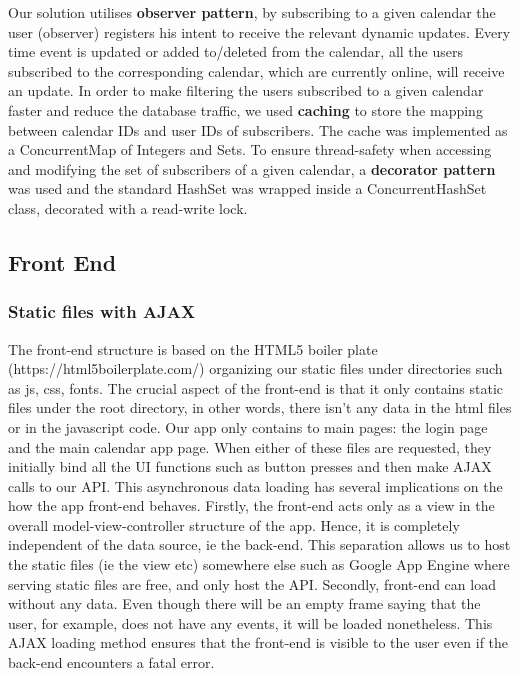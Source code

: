 \documentclass[10pt,a4paper]{article}
\begin{document}
Our solution utilises \textbf{observer pattern}, by subscribing to a given calendar the user (observer) registers his intent to receive the relevant dynamic updates. Every time event is updated 
or added to/deleted from the calendar, all the users subscribed to the corresponding calendar, which are currently online, will receive an update. In order to make filtering the users
subscribed to a given calendar faster and reduce the database traffic, we used \textbf{caching} to store the mapping between calendar IDs and user IDs of subscribers. The cache was implemented
as a ConcurrentMap of Integers and Sets. To ensure thread-safety when accessing and modifying the set of subscribers of a given calendar, a \textbf{decorator pattern} was used and the standard
HashSet was wrapped inside a ConcurrentHashSet class, decorated with a read-write lock.

\subsection{Front End}
\subsubsection{Static files with AJAX}
The front-end structure is based on the HTML5 boiler plate (https://html5boilerplate.com/) organizing our static files under directories such as js, css, fonts. The crucial aspect of the front-end is that it only contains static files under the root directory, in other words, there isn't any data in the html files or in the javascript code. Our app only contains to main pages: the login page and the main calendar app page. When either of these files are requested, they initially bind all the UI functions such as button presses and then make AJAX calls to our API. This asynchronous data loading has several implications on the how the app front-end behaves. Firstly, the front-end acts only as a view in the overall model-view-controller structure of the app. Hence, it is completely independent of the data source, ie the back-end. This separation allows us to host the static files (ie the view etc) somewhere else such as Google App Engine where serving static files are free, and only host the API. Secondly, front-end can load without any data. Even though there will be an empty frame saying that the user, for example, does not have any events, it will be loaded nonetheless. This AJAX loading method ensures that the front-end is visible to the user even if the back-end encounters a fatal error.
\end{document}
